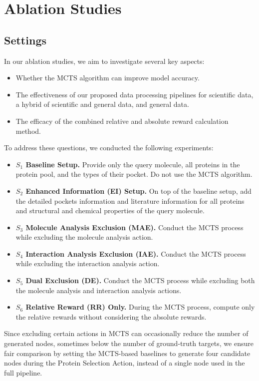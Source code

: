\documentclass[letterpaper,twocolumn,10pt]{llncs}
\begin{document}
\section{Ablation Studies}
\subsection{Settings}
In our ablation studies, we aim to investigate several key aspects:
\begin{itemize}
\item Whether the MCTS algorithm can improve model accuracy.
\item The effectiveness of our proposed data processing pipelines for scientific data, a hybrid of scientific and general data, and general data.
\item The efficacy of the combined relative and absolute reward calculation method.
\end{itemize}
To address these questions, we conducted the following experiments:

\begin{itemize}
\item \textbf{$S_1$ Baseline Setup.} Provide only the query molecule, all proteins in the protein pool, and the types of their pocket. Do not use the MCTS algorithm.
\item \textbf{$S_2$ Enhanced Information (EI) Setup.} On top of the baseline setup, add the detailed pockets information and literature information for all proteins and structural and chemical properties of the query molecule.
\item \textbf{$S_3$ Molecule Analysis Exclusion (MAE).} Conduct the MCTS process while excluding the molecule analysis action.
\item \textbf{$S_4$ Interaction Analysis Exclusion (IAE).} Conduct the MCTS process while excluding the interaction analysis action.
\item \textbf{$S_5$ Dual Exclusion (DE).} Conduct the MCTS process while excluding both the molecule analysis and interaction analysis actions.
\item \textbf{$S_6$ Relative Reward (RR) Only.} During the MCTS process, compute only the relative rewards without considering the absolute rewards.
\end{itemize}

Since excluding certain actions in MCTS can occasionally reduce the number of generated nodes, sometimes below the number of ground-truth targets, we ensure fair comparison by setting the MCTS-based baselines to generate four candidate nodes during the Protein Selection Action, instead of a single node used in the full pipeline.
\end{document}
